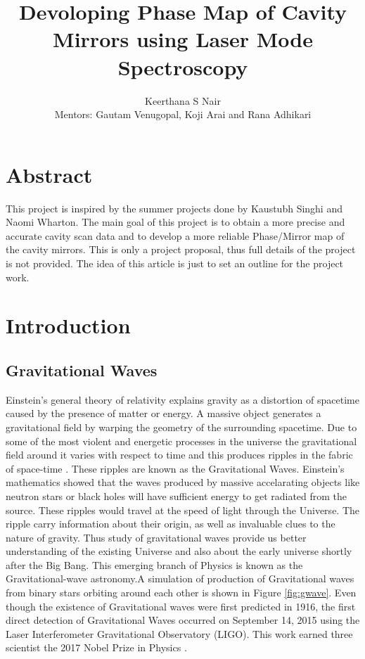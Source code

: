 \documentclass[colorlinks=true,pdfstartview=FitV,linkcolor=blue,
            citecolor=red,urlcolor=magenta]{ligodoc}
\title { \large Devoloping Phase Map of Cavity Mirrors using Laser Mode Spectroscopy }
\author{\begin{center}Keerthana S Nair
\\{Mentors: Gautam Venugopal, Koji Arai and Rana Adhikari}\end{center}}
\begin{document}
\section{Abstract} 
This project is inspired by the summer projects done by Kaustubh Singhi and Naomi Wharton. The main goal of this project is to obtain a more precise and accurate cavity scan data and to develop a more reliable Phase/Mirror map of the cavity mirrors. This is only a project proposal, thus full details of the project is not provided. The idea of this article is just to set an outline for the project work.
\section{Introduction} 
\subsection{Gravitational Waves}
Einstein's general theory of relativity explains gravity as a distortion of spacetime caused by the presence of matter or energy. A massive object generates a gravitational field by warping the geometry of the surrounding spacetime. Due to some of the most violent and energetic processes in the universe the gravitational field around it varies with respect to time and this produces ripples in the fabric of space-time \cite {gravitational waves}. These ripples are known as the Gravitational Waves. Einstein's mathematics showed that the waves produced by massive accelarating objects like neutron stars or black holes will have sufficient energy to get radiated from the source. These ripples would travel at the speed of light through the Universe. The ripple carry information about their origin, as well as invaluable clues to the nature of gravity. Thus study of gravitational waves provide us better understanding of the existing Universe and also about the early universe shortly after the Big Bang. This emerging branch of Physics is known as the Gravitational-wave astronomy.A simulation of production of Gravitational waves from binary stars orbiting around each other is shown in Figure \ref{fig:gwave}. Even though the existence of Gravitational waves were first predicted in 1916, the first direct detection of Gravitational Waves occurred on September 14, 2015 using the Laser Interferometer Gravitational Observatory (LIGO). This work earned three scientist the 2017 Nobel Prize in Physics \cite{gwaveurl}.

\end{document}
